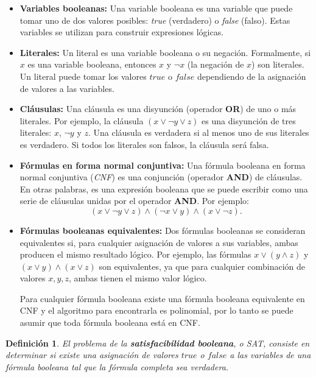 \documentclass[12pt]{article}
\newtheorem{definition}{Definición}
\begin{document}
\begin{itemize}
  \item \textbf{Variables booleanas:}
        Una variable booleana es una variable que puede tomar uno de dos valores posibles: \textit{true} (verdadero) o \textit{false} (falso). Estas variables se utilizan para construir expresiones lógicas.
  \item \textbf{Literales:}
        Un literal es una variable booleana o su negación. Formalmente, si \( x \) es una variable booleana, entonces \( x \) y \( \neg x \) (la negación de \( x \)) son literales. Un literal puede tomar los valores \( true \) o \( false \) dependiendo de la asignación de valores a las variables.
  \item  \textbf{Cláusulas:}
        Una cláusula es una disyunción (operador \textbf{OR}) de uno o más literales. Por ejemplo, la cláusula \( (x \vee \neg y \vee z) \) es una disyunción de tres literales: \( x \), \( \neg y \) y \( z \). Una cláusula es verdadera si al menos uno de sus literales es verdadero. Si todos los literales son falsos, la cláusula será falsa.
  \item \textbf{Fórmulas en forma normal conjuntiva:}
        Una fórmula booleana en forma normal conjuntiva (\textit{CNF}) es una conjunción (operador \textbf{AND}) de cláusulas. En otras palabras, es una expresión booleana que se puede escribir como una serie de cláusulas unidas por el operador \textbf{AND}. Por ejemplo:        
        \[
          (x \vee \neg y \vee z) \wedge (\neg x \vee y) \wedge (x \vee \neg z).
        \]
  \item \textbf{Fórmulas booleanas equivalentes:}
        Dos fórmulas booleanas se consideran equivalentes si, para cualquier asignación de valores a sus variables, ambas producen el mismo resultado lógico. Por ejemplo, las fórmulas \( x \vee (y \wedge z) \) y \( (x \vee y) \wedge (x \vee z) \) son equivalentes, ya que para cualquier combinación de valores \( x, y, z \), ambas tienen el mismo valor lógico.
        
        Para cualquier fórmula booleana existe una fórmula booleana equivalente en CNF \cite{authomataTheory} y 
        el algoritmo para encontrarla es polinomial, por lo tanto se puede asumir que toda fórmula booleana está en CNF.
        
\end{itemize}

\begin{definition}  
  El problema de la \textbf{satisfacibilidad booleana}, o SAT, consiste en determinar si existe una asignación de valores \( true \) o \( false \) a las variables de una fórmula booleana tal que la fórmula completa sea verdadera. 
\end{definition}
\end{document}

